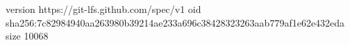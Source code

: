 version https://git-lfs.github.com/spec/v1
oid sha256:7c82984940aa263980b39214ae233a696c38428323263aab779af1e62e432eda
size 10068
